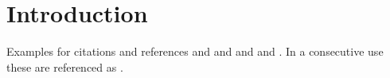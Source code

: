 \documentclass[10pt]{IEEEtran}
\begin{document}
\section{Introduction}
Examples for citations and references \cite{Firstman:2014:Approach} and \cite{Firstman:2013:Ongoing}
and \cite{Webpage:2014:Somewebpage}
and \cite{Bookman:2014:Somebook} and \cite{Chapman:2014:Starting}.
In a consecutive use these are referenced as
\cite{Firstman:2014:Approach,Firstman:2013:Ongoing,Webpage:2014:Somewebpage,Bookman:2014:Somebook,Chapman:2014:Starting}.




\end{document}
